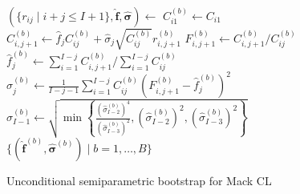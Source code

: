 \documentclass[a4paper]{book}
\begin{document}
\begin{figure}[p]
%
  \begin{algorithm}[H]
    \caption{Unconditional semiparametric bootstrap for Mack CL} 
    \label{alg:uncond-semiparam-mack}
    \begin{algorithmic} 
      \vspace{3pt}
      \State $(\{ r_{ij} \mid i + j \leq I + 1 \}, \bm{\widehat{f}}, \bm{\widehat{\sigma}}) \gets$  
      \vspace{3pt}
          \vspace{3pt}
          \State $C^{(b)}_{i1} \gets C_{i1}$
          \vspace{3pt}
        \EndFor
            \vspace{3pt}
            \State $C^{(b)}_{i, j + 1} \gets \widehat{f}_j C^{(b)}_{ij} + \widehat{\sigma}_j \sqrt{C^{(b)}_{ij}} r^{(b)}_{i, j + 1}$
            \vspace{3pt}
            \State $\displaystyle F^{(b)}_{i, j + 1} \gets C^{(b)}_{i, j + 1} / C^{(b)}_{ij}$
            \vspace{3pt}
          \EndFor
          \vspace{3pt}
          \State $\widehat{f}^{(b)}_j \gets \sum_{i = 1}^{I - j} C^{(b)}_{i, j + 1} / \sum_{i = 1}^{I - j} C^{(b)}_{ij}$
          \vspace{3pt}
            \State $\displaystyle \widehat{\sigma}^{(b)}_j \gets \frac{1}{I - j - 1}\sum_{i = 1}^{I-j} C^{(b)}_{ij}\left( F^{(b)}_{i, j + 1} - \widehat{f}^{(b)}_j \right)^2$
          \Else
            \vspace{3pt}
            \State $\widehat{\sigma}^{(b)}_{I - 1} \gets \sqrt{\min{ \left \{ \displaystyle \frac{(\widehat{\sigma}^{(b)}_{I - 2})^4}{(\widehat{\sigma}^{(b)}_{I - 3})^2}, (\widehat{\sigma}^{(b)}_{I - 2})^2, (\widehat{\sigma}^{(b)}_{I - 3})^2 \right \} }}$
            \vspace{3pt}
          \EndIf
        \EndFor
        \vspace{3pt}
      \EndFor
      \State \Return $\{ (\widehat{\bm{f}}^{(b)}, \widehat{\bm{\sigma}}^{(b)}) \mid b = 1, \dots, B \}$
    \end{algorithmic}
  \end{algorithm}
\end{figure}
\end{document}
